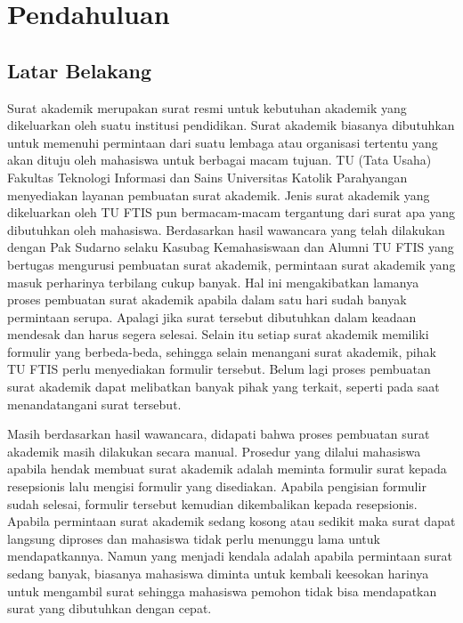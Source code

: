 \chapter{Pendahuluan}
\label{chap:pendahuluan}

\section{Latar Belakang}
\label{sec:latar_belakang}
Surat akademik merupakan surat resmi untuk kebutuhan akademik yang dikeluarkan oleh suatu institusi pendidikan. Surat akademik biasanya dibutuhkan untuk memenuhi permintaan dari suatu lembaga atau organisasi tertentu yang akan dituju oleh mahasiswa untuk berbagai macam tujuan. TU (Tata Usaha) Fakultas Teknologi Informasi dan Sains Universitas Katolik Parahyangan menyediakan layanan pembuatan surat akademik. Jenis surat akademik yang dikeluarkan oleh TU FTIS pun bermacam-macam tergantung dari surat apa yang dibutuhkan oleh mahasiswa. Berdasarkan hasil wawancara yang telah dilakukan dengan Pak Sudarno selaku Kasubag Kemahasiswaan dan Alumni TU FTIS yang bertugas mengurusi pembuatan surat akademik, permintaan surat akademik yang masuk perharinya terbilang cukup banyak. Hal ini mengakibatkan lamanya proses pembuatan surat akademik apabila dalam satu hari sudah banyak permintaan serupa. Apalagi jika surat tersebut dibutuhkan dalam keadaan mendesak dan harus segera selesai. Selain itu setiap surat akademik memiliki formulir yang berbeda-beda, sehingga selain menangani surat akademik, pihak TU FTIS perlu menyediakan formulir tersebut. Belum lagi proses pembuatan surat akademik dapat melibatkan banyak pihak yang terkait, seperti pada saat menandatangani surat tersebut.  \

Masih berdasarkan hasil wawancara, didapati bahwa proses pembuatan surat akademik masih dilakukan secara manual. Prosedur yang dilalui mahasiswa apabila hendak membuat surat akademik adalah meminta formulir surat kepada resepsionis lalu mengisi formulir yang disediakan. Apabila pengisian formulir sudah selesai, formulir tersebut kemudian dikembalikan kepada resepsionis. Apabila permintaan surat akademik sedang kosong atau sedikit maka surat dapat langsung diproses dan mahasiswa tidak perlu menunggu lama untuk mendapatkannya. Namun yang menjadi kendala adalah apabila permintaan surat sedang banyak, biasanya mahasiswa diminta untuk kembali keesokan harinya untuk mengambil surat sehingga mahasiswa pemohon tidak bisa mendapatkan surat yang dibutuhkan dengan cepat. \

